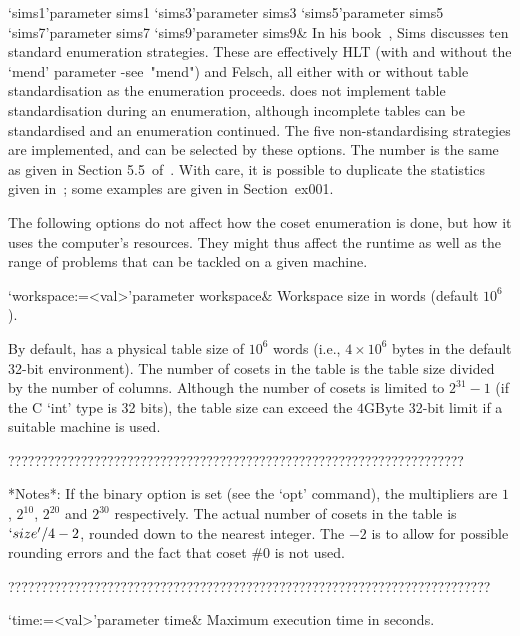 \>`sims1'{parameter sims1}
\>`sims3'{parameter sims3}
\>`sims5'{parameter sims5}
\>`sims7'{parameter sims7}
\>`sims9'{parameter sims9}&
In  his  book~\cite{Sim},  Sims discusses  ten  standard  enumeration
strategies.  These  are effectively HLT  (with and without  the `mend'
parameter -see~"mend")  and Felsch, all  either with or  without table
standardisation as the enumeration proceeds.
{\ACE} does not implement table standardisation during an enumeration,
although  incomplete tables  can  be standardised  and an  enumeration
continued.
The  five non-standardising  strategies  are implemented,  and can  be
selected by these options.  The number is the same as given in Section
5.5~of~\cite{Sim}.   With  care,  it  is  possible  to  duplicate  the
statistics   given  in~\cite{Sim};  some   examples  are   given  in
Section~{ex001}.


The following options do not affect how the coset enumeration is done,
but how it  uses the computer's resources. They  might thus affect the
runtime as  well as  the range of  problems that  can be tackled  on a
given machine.

\beginitems

\>`workspace:=<val>'{parameter workspace}&
Workspace size in words (default $10^6$).


By default, {\ACE} has a physical table size of $10^6$ words (i.e., $4
\times 10^6$ bytes in the  default 32-bit environment).  The number of
cosets  in the  table  is the  table  size divided  by  the number  of
columns.  Although the  number of cosets is limited  to $2^{31}-1$ (if
the C `int'  type is 32 bits), the table size  can exceed the $4$GByte
32-bit limit if a suitable machine is used.

?????????????????????????????????????????????????????????????????????

*Notes*:
If the binary option is set (see the `opt' command), the multipliers
  are $1$, $2^{10}$\kern-2pt, $2^{20}$ and $2^{30}$ respectively.
The actual number of cosets in the table is $`size'/4 -2$, rounded
  down to the nearest integer.
The $-2$ is to allow for possible rounding errors and the fact that coset
  \#0 is not used.

?????????????????????????????????????????????????????????????????????????

\>`time:=<val>'{parameter time}&
Maximum execution time in seconds.

